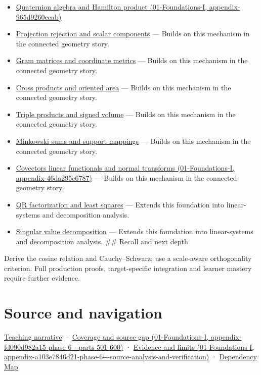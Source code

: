 \begin{itemize}
\item
  \href{../01-Foundations-I/main.pdf\#nameddest=appendix-965d9260eeab}{Quaternion algebra and Hamilton product (01-Foundations-I, appendix-965d9260eeab)}
\item
  \hyperref[appendix-505a502c372a]{Projection rejection and scalar components} --- Builds on this mechanism in the connected geometry story.
\item
  \hyperref[appendix-3b863809f82a]{Gram matrices and coordinate metrics} --- Builds on this mechanism in the connected geometry story.
\item
  \hyperref[appendix-2391db8052b1]{Cross products and oriented area} --- Builds on this mechanism in the connected geometry story.
\item
  \hyperref[appendix-5caa058bd9c7]{Triple products and signed volume} --- Builds on this mechanism in the connected geometry story.
\item
  \hyperref[appendix-215ac7099a82]{Minkowski sums and support mappings} --- Builds on this mechanism in the connected geometry story.
\item
  \href{../01-Foundations-I/main.pdf\#nameddest=appendix-46da295c6787}{Covectors linear functionals and normal transforms (01-Foundations-I, appendix-46da295c6787)} --- Builds on this mechanism in the connected geometry story.
\item
  \hyperref[appendix-c3421e6b4f2c]{QR factorization and least squares} --- Extends this foundation into linear-systems and decomposition analysis.
\item
  \hyperref[appendix-1fad5e7f36fa]{Singular value decomposition} --- Extends this foundation into linear-systems and decomposition analysis. \#\# Recall and next depth
\end{itemize}

Derive the cosine relation and Cauchy--Schwarz; use a scale-aware orthogonality criterion. Full production proofs, target-specific integration and learner mastery require further evidence.

\section{Source and navigation}\label{appendix-8bc4e8fc547c-source-and-navigation}

\href{Continuous\%20Notes/Computing\%20Foundations\%20-\%20From\%20Bits\%20to\%20C++\%20and\%20Systems\%20APIs\#The\%20dot\%20product\%20turns\%20two\%20movements\%20into\%20a\%20measurement}{Teaching narrative} · \href{../01-Foundations-I/main.pdf\#nameddest=appendix-fd090d982a15-phase-6---parts-501-600}{Coverage and source gap (01-Foundations-I, appendix-fd090d982a15-phase-6-\/-\/-parts-501-600)} · \href{../01-Foundations-I/main.pdf\#nameddest=appendix-a103e7846d21-phase-6---source-analysis-and-verification}{Evidence and limits (01-Foundations-I, appendix-a103e7846d21-phase-6-\/-\/-source-analysis-and-verification)} · \hyperref[appendix-4ad47bdd269a]{Dependency Map}
